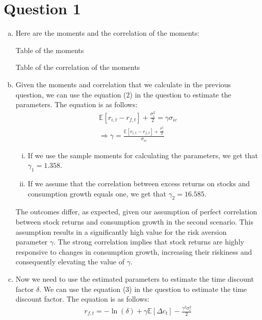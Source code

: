 
\section*{Question 1}
\begin{enumerate}[(a)]

  \item Here are the moments and the correlation of the moments:
  \begin{table}[htbp!]
    \centering
    \caption{Table of the moments}
    \label{tab:1a}
    
  \end{table}
  \begin{table}[htbp!]
    \centering
    \caption{Table of the correlation of the moments}
    \label{tab:1a_corr}
    
  \end{table}
  \item Given the moments and correlation that we calculate in the previous question, we can use the equation (2) in the question to estimate the parameters. The equation is as follows:
  \begin{gather*}
    \mathbb{E}[r_{i,t}-r_{f,t}] + \frac{\sigma^2_i}{2} = \gamma \sigma_{ic} \\
    \Rightarrow \gamma = \frac{\mathbb{E}[r_{i,t}-r_{f,t}] + \frac{\sigma^2_i}{2}}{\sigma_{ic}} 
  \end{gather*}
  \begin{enumerate}[i.]
   \item  If we use the sample moments for calculating the parameters, we get that $\gamma_1 = 1.358$.
   \item If we assume that the correlation between
   excess returns on stocks and consumption growth equals one, we get that $\gamma_2 = 16.585$.
  \end{enumerate}
  The outcomes differ, as expected, given our assumption of perfect correlation between stock returns and consumption growth in the second scenario. This assumption results in a significantly high value for the risk aversion parameter $\gamma$. The strong correlation implies that stock returns are highly responsive to changes in consumption growth, increasing their riskiness and consequently elevating the value of $\gamma$.
  \item Now we need to use the estimated parameters to estimate the time discount factor $\delta$. We can use the equation (3) in the question to estimate the time discount factor. The equation is as follows:
  \begin{gather*}
    r_{f,t} = - \ln(\delta) + \gamma\mathbb{E}[\Delta c_t ] - \frac{\gamma^2 \sigma_c^2}{2} 

\end{gather*}
\end{enumerate}
